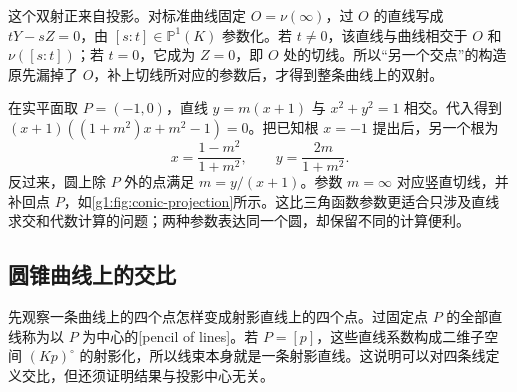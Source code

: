 这个双射正来自投影。对标准曲线固定 \(O=\nu(\infty)\)，过 \(O\) 的直线写成 \(tY-sZ=0\)，由 \([s:t]\in\mathbb P^1(K)\) 参数化。若 \(t\ne0\)，该直线与曲线相交于 \(O\) 和 \(\nu([s:t])\)；若 \(t=0\)，它成为 \(Z=0\)，即 \(O\) 处的切线。所以“另一个交点”的构造原先漏掉了 \(O\)，补上切线所对应的参数后，才得到整条曲线上的双射。

\begin{example}\label{g1:exm:circle-parametrization}
	在实平面取 \(P=(-1,0)\)，直线 \(y=m(x+1)\) 与 \(x^2+y^2=1\) 相交。代入得到 \((x+1)((1+m^2)x+m^2-1)=0\)。把已知根 \(x=-1\) 提出后，另一个根为
	\[
		x=\frac{1-m^2}{1+m^2},\qquad y=\frac{2m}{1+m^2}.
	\]
	反过来，圆上除 \(P\) 外的点满足 \(m=y/(x+1)\)。参数 \(m=\infty\) 对应竖直切线，并补回点 \(P\)，如\cref{g1:fig:conic-projection}所示。这比三角函数参数更适合只涉及直线求交和代数计算的问题；两种参数表达同一个圆，却保留不同的计算便利。
\end{example}

\subsection{圆锥曲线上的交比}
\label{g1:subsec:0205:02}

先观察一条曲线上的四个点怎样变成射影直线上的四个点。过固定点 \(P\) 的全部直线称为以 \(P\) 为中心的[pencil of lines]。若 \(P=[p]\)，这些直线系数构成二维子空间 \((Kp)^\circ\) 的射影化，所以线束本身就是一条射影直线。这说明可以对四条线定义交比，但还须证明结果与投影中心无关。

